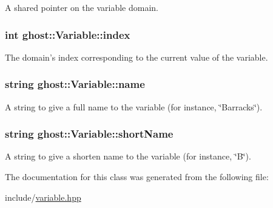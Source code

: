 A shared pointer on the variable domain. 

\hypertarget{classghost_1_1Variable_a934efa463fb1897b4266040e321dbc41}{
\subsubsection[{index}]{\setlength{\rightskip}{0pt plus 5cm}int ghost\-::\-Variable\-::index\hspace{0.3cm}{\ttfamily [protected]}}}\label{classghost_1_1Variable_a934efa463fb1897b4266040e321dbc41}


The domain's index corresponding to the current value of the variable. 

\hypertarget{classghost_1_1Variable_a05cf4a4cd3a5c033028e0b0f11d1dafd}{
\subsubsection[{name}]{\setlength{\rightskip}{0pt plus 5cm}string ghost\-::\-Variable\-::name\hspace{0.3cm}{\ttfamily [protected]}}}\label{classghost_1_1Variable_a05cf4a4cd3a5c033028e0b0f11d1dafd}


A string to give a full name to the variable (for instance, \char`\"{}\-Barracks\char`\"{}). 

\hypertarget{classghost_1_1Variable_afb5eb79a7f6351b4305fe082699b6d7d}{
\subsubsection[{short\-Name}]{\setlength{\rightskip}{0pt plus 5cm}string ghost\-::\-Variable\-::short\-Name\hspace{0.3cm}{\ttfamily [protected]}}}\label{classghost_1_1Variable_afb5eb79a7f6351b4305fe082699b6d7d}


A string to give a shorten name to the variable (for instance, \char`\"{}\-B\char`\"{}). 



The documentation for this class was generated from the following file\-:\begin{DoxyCompactItemize}
\item 
include/\hyperlink{variable_8hpp}{variable.\-hpp}\end{DoxyCompactItemize}
